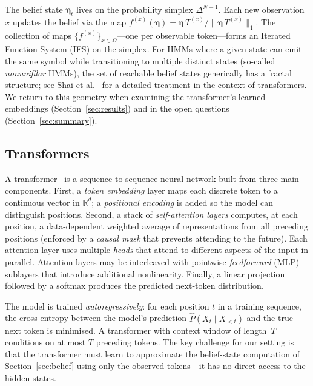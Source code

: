\documentclass[11pt]{article}
\begin{document}
The belief state $\boldsymbol{\eta}_t$ lives on the probability simplex $\Delta^{N-1}$.  Each new observation $x$ updates the belief via the map $f^{(x)}(\boldsymbol{\eta}) = \boldsymbol{\eta}\,T^{(x)} / \lVert \boldsymbol{\eta}\,T^{(x)}\rVert_1$.  The collection of maps $\{f^{(x)}\}_{x \in \Omega}$---one per observable token---forms an Iterated Function System (IFS) on the simplex.  For HMMs where a given state can emit the same symbol while transitioning to multiple distinct states (so-called \emph{nonunifilar} HMMs), the set of reachable belief states generically has a fractal structure; see Shai et al.~\cite{shai2024} for a detailed treatment in the context of transformers.  We return to this geometry when examining the transformer's learned embeddings (Section~\ref{sec:results}) and in the open questions (Section~\ref{sec:summary}).

\subsection{Transformers}\label{sec:transformer-prelim}

A transformer~\cite{vaswani2017} is a sequence-to-sequence neural network built from three main components.  First, a \emph{token embedding} layer maps each discrete token to a continuous vector in $\mathbb{R}^d$; a \emph{positional encoding} is added so the model can distinguish positions.  Second, a stack of \emph{self-attention layers} computes, at each position, a data-dependent weighted average of representations from all preceding positions (enforced by a \emph{causal mask} that prevents attending to the future).  Each attention layer uses multiple \emph{heads} that attend to different aspects of the input in parallel.  Attention layers may be interleaved with pointwise \emph{feedforward} (MLP) sublayers that introduce additional nonlinearity.  Finally, a linear projection followed by a softmax produces the predicted next-token distribution.

The model is trained \emph{autoregressively}: for each position $t$ in a training sequence, the cross-entropy between the model's prediction $\hat{P}(X_t \mid X_{<t})$ and the true next token is minimised.  A transformer with context window of length~$T$ conditions on at most $T$ preceding tokens.  The key challenge for our setting is that the transformer must learn to approximate the belief-state computation of Section~\ref{sec:belief} using only the observed tokens---it has no direct access to the hidden states.
\end{document}

